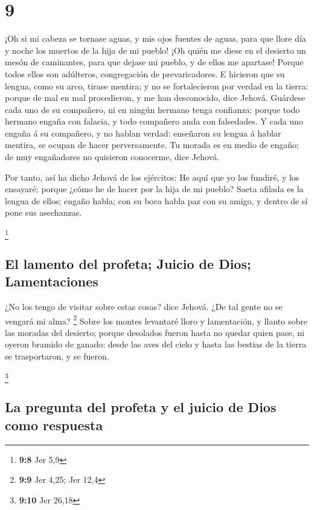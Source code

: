 \hypertarget{section-8}{%
\section{9}\label{section-8}}

 ¡Oh si mi cabeza se tornase aguas, y mis ojos fuentes de
aguas, para que llore día y noche los muertos de la hija de mi pueblo!
 ¡Oh quién me diese en el desierto un mesón de caminantes,
para que dejase mi pueblo, y de ellos me apartase! Porque todos ellos
son adúlteros, congregación de prevaricadores.  E hicieron
que su lengua, como su arco, tirase mentira; y no se fortalecieron por
verdad en la tierra: porque de mal en mal procedieron, y me han
desconocido, dice Jehová.  Guárdese cada uno de su
compañero, ni en ningún hermano tenga confianza: porque todo hermano
engaña con falacia, y todo compañero anda con falsedades. 
Y cada uno engaña á su compañero, y no hablan verdad: enseñaron su
lengua á hablar mentira, se ocupan de hacer perversamente.
 Tu morada es en medio de engaño; de muy engañadores no
quisieron conocerme, dice Jehová.

 Por tanto, así ha dicho Jehová de los ejércitos: He aquí
que yo los fundiré, y los ensayaré; porque ¿cómo he de hacer por la hija
de mi pueblo?  Saeta afilada es la lengua de ellos; engaño
habla; con su boca habla paz con su amigo, y dentro de sí pone sus
asechanzas.

\footnote{\textbf{9:8} Jer 5,9}

\hypertarget{el-lamento-del-profeta-juicio-de-dios-lamentaciones}{%
\subsection{El lamento del profeta; Juicio de Dios;
Lamentaciones}\label{el-lamento-del-profeta-juicio-de-dios-lamentaciones}}

 ¿No los tengo de visitar sobre estas cosas? dice Jehová.
¿De tal gente no se vengará mi alma? \footnote{\textbf{9:9} Jer 4,25;
  Jer 12,4}  Sobre los montes levantaré lloro y
lamentación, y llanto sobre las moradas del desierto; porque desolados
fueron hasta no quedar quien pase, ni oyeron bramido de ganado: desde
las aves del cielo y hasta las bestias de la tierra se trasportaron, y
se fueron.

\footnote{\textbf{9:10} Jer 26,18}

\hypertarget{la-pregunta-del-profeta-y-el-juicio-de-dios-como-respuesta}{%
\subsection{La pregunta del profeta y el juicio de Dios como
respuesta}\label{la-pregunta-del-profeta-y-el-juicio-de-dios-como-respuesta}}

